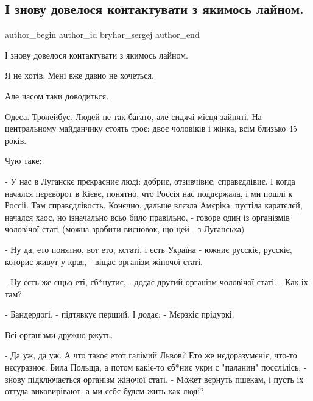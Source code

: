  
 
 
 
 
 
\subsection{І знову довелося контактувати з якимось лайном.}
\label{sec:27_07_2021.fb.bryhar_sergej.1.lajno}
 
\ifcmt
 author_begin
   author_id bryhar_sergej
 author_end
\fi

І знову довелося контактувати з якимось лайном.

Я не хотів. Мені вже давно не хочеться. 

Але часом таки доводиться.

Одеса. Тролейбус. Людей не так багато, але сидячі місця зайняті. На
центральному майданчику стоять троє: двоє чоловіків і жінка, всім близько 45
років. 

Чую таке:

- У нас в Луганскє прєкрасниє люді: добриє, отзивчівиє, справєдлівиє. І когда
начался пєрєворот в Кієвє, понятно, что Россія нас поддєржала, і ми пошлі к
Россіі. Там справєдлівость. Конєчно, дальше влєзла Амєріка, пустіла каратєлєй,
начался хаос, но ізначально всьо било правільно, - говоре один із організмів
чоловічої статі (можна зробити висновок, що цей - з Луганська)

- Ну да, ето понятно, вот ето, кстаті, і єсть Україна - южниє русскіє, русскіє,
коториє живут у края, - віщає організм жіночої статі.

- Ну єсть же єщьо еті, єб*нутиє, - додає другий організм чоловічої статі. - Как
іх там?

- Бандердогі, - підтявкує перший. І додає: - Мєрзкіє прідуркі. 

Всі організми дружно ржуть.

- Да уж, да уж. А что такоє етот галімий Львов? Ето же нєдоразумєніє, что-то
нєсуразноє. Била Польща, а потом какіє-то єб*ниє укри с "паланин" посєлілісь, -
знову підключається організм жіночої статі. - Может вєрнуть пшекам, і пусть іх
оттуда виковирівают, а ми сєбє будєм жить как люді?

